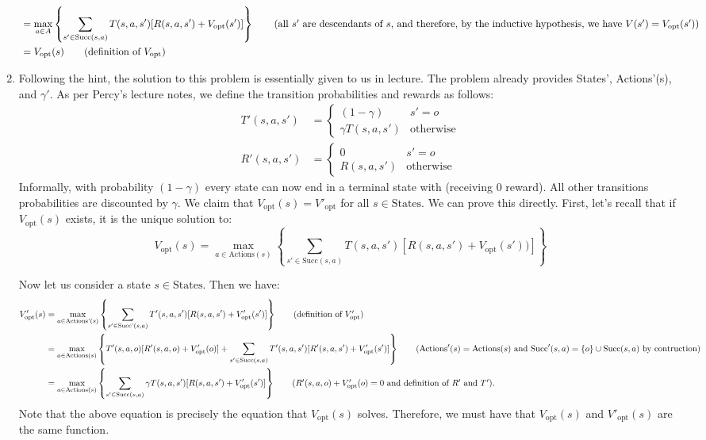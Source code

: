 \documentclass[12pt]{article}
\begin{document}
\begin{enumerate}[label=(\alph*)]
\begin{align*}
    &= \max_{a \in A} \left\{ \sum_{s' \in \text{Succ}(s,a)}T(s,a,s' )[R(s,a,s') + V_{\text{opt}}(s')] \right\} \tag{all $s'$ are descendants of $s$, and therefore, by the inductive hypothesis, we have $V(s') = V_\text{opt}(s')$} \\
    &= V_{\text{opt}}(s) \tag{definition of $V_\text{opt}$}
  \end{align*}
  \item Following the hint, the solution to this problem is essentially given to us in lecture. The problem already provides States', Actions'(s), and $\gamma'$. As per Percy's lecture notes, we define the transition probabilities and rewards as follows:
  \begin{align*}
    T'(s, a, s') &=
      \begin{cases} 
        (1-\gamma) & s' = o \\
        \gamma T(s, a, s') & \text{otherwise}
     \end{cases} \\
    R'(s, a, s') &= 
      \begin{cases} 
        0 & s' = o \\
        R(s, a, s') & \text{otherwise}
      \end{cases}
  \end{align*}
  Informally, with probability $(1-\gamma)$ every state can now end in a terminal state with (receiving $0$ reward). All other transitions probabilities are discounted by $\gamma$. We claim that $V_{\text{opt}}(s) = V'_{\text{opt}}$ for all $s \in \text{States}$. We can prove this directly. First, let's recall that if $V_{\text{opt}}(s)$ exists, it is the unique solution to:
  $$
    V_{\text{opt}}(s) = \max_{a \in \text{Actions}(s)}\left\{ \sum_{s' \in \text{Succ}(s,a)} T(s,a,s')[R(s,a,s
  ') + V_\text{opt}(s'))] \right\}
  $$


  Now let us consider a state $s \in \text{States}$. Then we have:
  \begin{align*}
    V'_{\text{opt}}(s) &= \max_{a \in \text{Actions'}(s)}\left \{ \sum_{s' \in \text{Succ'}(s,a)} T'(s,a,s')[R(s,a,s') + V'_{\text{opt}}(s')] \right\} \tag{definition of $V'_{\text{opt}}$}\\
    &= \max_{a \in \text{Actions}(s)}\left \{ T'(s,a,o)[R'(s,a,o) + V'_{\text{opt}}(o)] + \sum_{s' \in \text{Succ}(s,a)} T'(s,a,s')[R'(s,a,s') + V'_{\text{opt}}(s')] \right\} \tag{$\text{Actions}'(s) = \text{Actions}(s)$ and $\text{Succ}'(s,a) = \{o\} \cup \text{Succ}(s,a)$ by contruction} \\
    &= \max_{a \in \text{Actions}(s)}\left \{ \sum_{s' \in \text{Succ}(s,a)} \gamma T(s,a,s')[R(s,a,s') + V'_{\text{opt}}(s')] \right\} \tag{$R'(s,a,o) + V'_{\text{opt}}(o) = 0$ and definition of $R'$ and $T'$}.
  \end{align*}
  Note that the above equation is precisely the equation that $V_{\text{opt}}(s)$ solves. Therefore, we must have that $V_{\text{opt}}(s)$ and $V'_{\text{opt}}(s)$ are the same function.
\end{enumerate}
\end{document}
